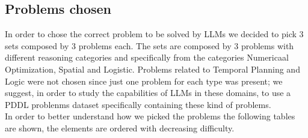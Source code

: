 \documentclass[a4paper]{article}
\begin{document}
    \subsection{Problems chosen}
    In order to chose the correct problem to be solved by LLMs we decided to pick 3 sets composed by 3 problems each. The sets are composed by 3 problems with different reasoning categories and specifically from the categories Numericaal Optimization, Spatial and Logistic. Problems related to Temporal Planning and Logic were not chosen since just one problem for each type was present; we suggest, in order to study the capabilities of LLMs in these domains, to use a PDDL problenms dataset specifically containing these kind of problems.\\
    In order to better understand how we picked the problems the following tables are shown, the elements are ordered with decreasing difficulty.
    
\end{document}
